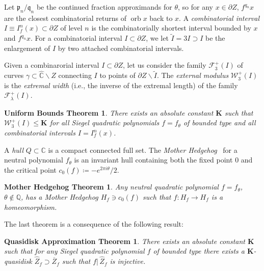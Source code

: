 \documentclass{amsart}
\newcommand{\1}{{\mathbb 1 }}
\newcommand{\Width}{{\mathcal W}}
\newcommand\FF{\mathcal{F}}
\newcommand{\wZ}{{\widehat Z}}
\newcommand{\bK}{{\mathbf K}}
\newcommand{\pp}{\mathfrak{p}}
\newcommand{\qq}{\mathfrak{q}}
\newcommand{\wC}{\widehat{\mathbb{C}}}
\newcommand{\C}{\mathbb{C}}
\newcommand{\Q}{\mathbb{Q}}
\newtheorem{UniformBounds}[thm]{Uniform Bounds Theorem}
\newtheorem{Hedgehog}[thm]{Mother Hedgehog Theorem}
\newtheorem{Quasidisk}[thm]{Quasidisk Approximation Theorem}
\theoremstyle{remark}
\numberwithin{equation}{section}
\theoremstyle{definition}
\newcommand{\di}{\partial}
\def\sm{\smallsetminus}
\newcommand{\orb}{\operatorname{orb}}
\begin{document}
Let $\pp_n/\qq_n$ be the continued fraction
approximands for $\theta$, so for any $x\in \di Z$, $f^{q_n} x$ are
the closest combinatorial returns of $\orb x$ back to $x$. A {\em combinatorial
  interval} $I\equiv I_f^n(x) \subset \di Z$ of level $n$ is  the combinatorially shortest  interval bounded by $x$ and
$f^{q_n} x$. For a combinatorial interval $I\subset \di Z$, we let
$\widetilde I= 3I\supset I$ be the enlargement  of $I$ by  two attached combinatorial intervals.  

Given a combinarorial interval $I\subset \di Z$, let us consider the
family $\FF^+_3(I)$ of curves $\gamma\subset \wC\sm Z$  connecting $I$ to 
points of $\di Z\sm \widetilde I$. The {\em external modulus} $\Width^+_3(I)$ is the {\em extremal width} (i.e., the inverse of the extremal length)  of the family $\FF^+_\lambda(I)$.





\begin{UniformBounds}%
\label{thm:unform bounds}
  There exists an absolute constant $\bK$ such that
  $\Width^+_3(I)\leq \bK$ for all Siegel quadratic polynomials $f=f_\theta$ of bounded type and all combinatorial intervals $ I=I_f^n(x)$.
\end{UniformBounds}%





A {\em hull} $Q\subset \C$ is a compact connected full set.
The {\em  Mother Hedgehog}~\cite{Ch} for a neutral polynomial $f_\theta$
is an invariant hull containing both the fixed point $0$ and the critical
point $c_0(f)\coloneqq -e^{2\pi i \theta}/2$.

\begin{Hedgehog}
\label{thm:hedgehog}
  Any neutral quadratic polynomial $f=f_\theta$, $\theta\not\in \Q$,
  has a Mother Hedgehog $H_f\ni c_0(f)$ such that $f\colon  H_f \to H_f$ is a homeomorphism.
\end{Hedgehog}

The last theorem is a consequence of the following result:

\begin{Quasidisk}
\label{thm:quasidisk}
   There exists an absolute constant $\bK$ such that for any Siegel
   quadratic polynomial $f$ of bounded type there exists a $\bK$-quasidisk
    $\wZ_f\supset  \overline Z_f$ such that $f|\, \wZ_f$ is injective. 
 \end{Quasidisk}   
\end{document}
